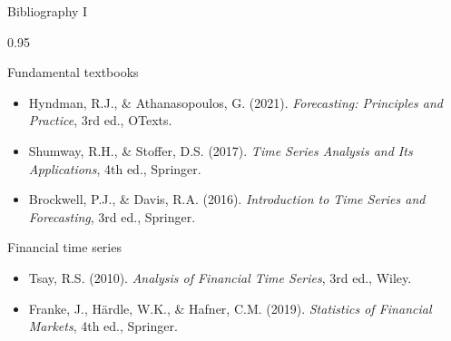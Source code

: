 \documentclass[9pt, aspectratio=169, t]{beamer}
\begin{document}
\begin{frame}{Bibliography I}
    \begin{cminipage}{0.95\textwidth}
    \begin{block}{Fundamental textbooks}
        {\small
        \begin{itemize}\setlength{\itemsep}{0pt}
            \item Hyndman, R.J., \& Athanasopoulos, G. (2021). \textit{Forecasting: Principles and Practice}, 3rd ed., OTexts.
            \item Shumway, R.H., \& Stoffer, D.S. (2017). \textit{Time Series Analysis and Its Applications}, 4th ed., Springer.
            \item Brockwell, P.J., \& Davis, R.A. (2016). \textit{Introduction to Time Series and Forecasting}, 3rd ed., Springer.
        \end{itemize}
        }
    \end{block}

    \begin{exampleblock}{Financial time series}
        {\small
        \begin{itemize}\setlength{\itemsep}{0pt}
            \item Tsay, R.S. (2010). \textit{Analysis of Financial Time Series}, 3rd ed., Wiley.
            \item Franke, J., H\"ardle, W.K., \& Hafner, C.M. (2019). \textit{Statistics of Financial Markets}, 4th ed., Springer.
        \end{itemize}
        }
    \end{exampleblock}
    \end{cminipage}
\end{frame}
\end{document}
